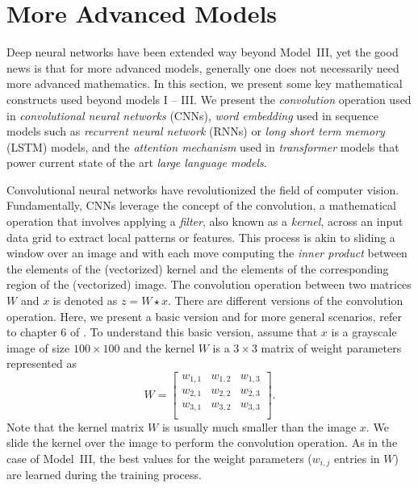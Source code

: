 \documentclass[12pt]{article}
\begin{document}
\section{More Advanced Models}
\label{sec:more-advanced-models}
Deep neural networks have been extended way beyond Model~III, yet the good news is that for more advanced models, generally one does not necessarily need more advanced mathematics. In this section, we present some key mathematical constructs used beyond models I -- III. We present  the {\em convolution} operation used in {\em convolutional neural networks} (CNNs), {\em word embedding} used in sequence models such as {\em recurrent neural network} (RNNs) or {\em long short term memory} (LSTM) models, and the {\em attention mechanism} used in {\em transformer} models that power current state of the art {\em large language models}.

Convolutional neural networks have revolutionized the field of computer vision. Fundamentally, CNNs leverage the concept of the convolution, a mathematical operation that involves applying a {\em filter}, also known as a {\em kernel}, across an input data grid to extract local patterns or features. This process is akin to sliding a window over an image and with each move computing the {\em inner product} between the elements of the (vectorized) kernel and the elements of the corresponding region of the (vectorized) image. The convolution operation between two matrices $W$ and $x$ is denoted as $z = W \star x$. There are different versions of the convolution operation. Here, we present a basic version and for more general scenarios, refer to chapter 6 of  \cite{LiquetMokaNazarathy2024DeepLearning}. To understand this basic version, assume that $x$ is a grayscale image of size $100 \times 100$ and the kernel $W$ is a $3\times 3$ matrix of weight parameters represented as
%
\begin{equation}
\label{eq:conv-kernel}
W = 
\begin{bmatrix}
    w_{1,1} & w_{1,2} & w_{1,3} \\
    w_{2,1} & w_{2,2} & w_{2,3} \\
    w_{3,1} & w_{3,2} & w_{3,3} \\
\end{bmatrix}.
\end{equation}
%
Note that the kernel matrix $W$ is usually much smaller than the image $x$. We slide the kernel over the image to perform the convolution operation. As in the case of Model~III, the best values for the weight parameters ($w_{i, j}$ entries in $W$) are learned during the training process. 
\end{document}
